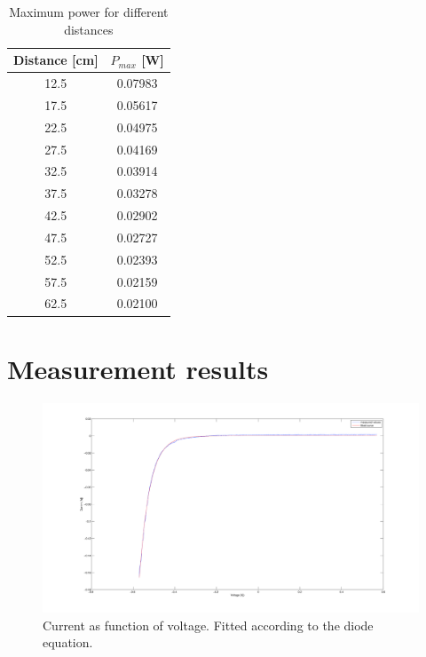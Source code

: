\documentclass[12pt,a4paper]{article}
\begin{document}
\begin{table}
  \centering
  \begin{tabular}{|c|c|}
    \hline
    Distance [cm] & $P_{max}$ [W] \\
    \hline
    12.5 & 0.07983 \\
    17.5 & 0.05617 \\
    22.5 & 0.04975 \\
    27.5 & 0.04169 \\
    32.5 & 0.03914 \\
    37.5 & 0.03278 \\
    42.5 & 0.02902 \\
    47.5 & 0.02727 \\
    52.5 & 0.02393 \\
    57.5 & 0.02159 \\
    62.5 & 0.02100 \\
    \hline
  \end{tabular}
  \caption{Maximum power for different distances}
  \label{tab}
\end{table}

\newpage
\section{Measurement results}
\vfill
\begin{figure}[h!]
  \begin{center}
    \includegraphics[scale=0.07]{IvsUnoIlumination.png}
  \end{center}
  \caption{Current as function of voltage. Fitted according to the diode equation.}
  \label{ivsun}
\end{figure}
\end{document}

